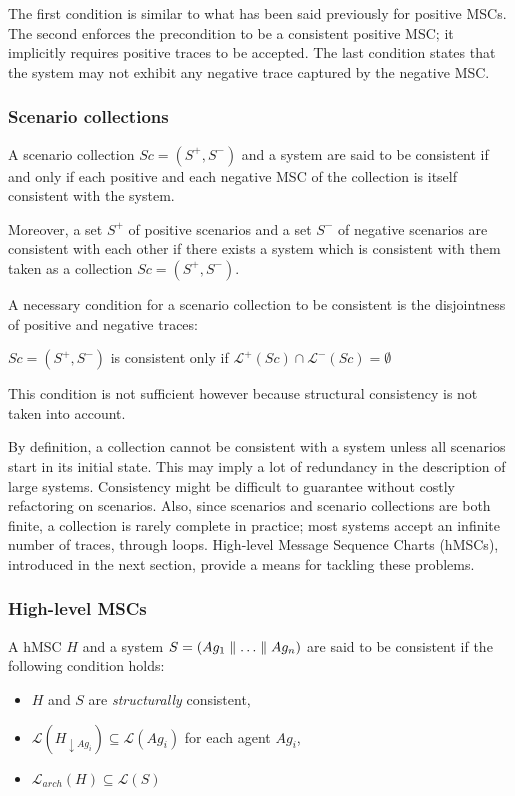 The first condition is similar to what has been said previously for positive MSCs. The second enforces the precondition to be a consistent positive MSC; it implicitly requires positive traces to be accepted. The last condition states that the system may not exhibit any negative trace captured by the negative MSC.

\subsubsection*{Scenario collections}

A scenario collection $Sc = (S^+,S^-)$ and a system are said to be consistent if and only if each positive and each negative MSC of the collection is itself consistent with the system. 

Moreover, a set $S^+$ of positive scenarios and a set $S^-$ of negative scenarios are consistent with each other if there exists a system which is consistent with them taken as a collection $Sc = (S^+,S^-)$. 

A necessary condition for a scenario collection to be consistent is the disjointness of positive and negative traces:

\begin{center}
$Sc = (S^+,S^-)$ is consistent only if $\mathcal{L}^+(Sc) \cap \mathcal{L}^-(Sc) = \emptyset$
\end{center}

This condition is not sufficient however because structural consistency is not taken into account.

By definition, a collection cannot be consistent with a system unless all scenarios start in its initial state. This may imply a lot of redundancy in the description of large systems. Consistency might be difficult to guarantee without costly refactoring on scenarios. Also, since scenarios and scenario collections are both finite, a collection is rarely complete in practice; most systems accept an infinite number of traces, through loops.  High-level Message Sequence Charts (hMSCs), introduced in the next section, provide a means for tackling these problems.

\subsubsection*{High-level MSCs}

A hMSC $H$ and a system $S = (Ag_1 \parallel \ldots \parallel Ag_n)$ are said to be consistent if the following condition holds:

\begin{itemize}
\item $H$ and $S$ are \emph{structurally} consistent,
\item $\mathcal{L}(H_{\downarrow Ag_i}) \subseteq \mathcal{L}(Ag_i)$ for each agent $Ag_i$,
\item $\mathcal{L}_{arch}(H) \subseteq \mathcal{L}(S)$
\end{itemize}

